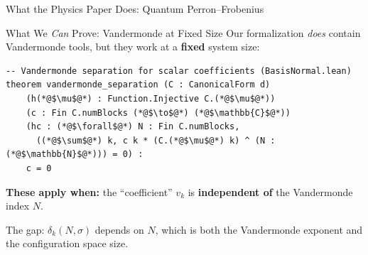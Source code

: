 \documentclass[aspectratio=169,10pt]{beamer}
\begin{document}
\begin{frame}{What the Physics Paper Does: Quantum Perron--Frobenius}
\vspace{0.3em}
\begin{center}
\end{center}
\end{frame}

\begin{frame}[fragile]{What We \emph{Can} Prove: Vandermonde at Fixed Size}
\vspace{-0.5em}
{\small Our formalization \emph{does} contain Vandermonde tools, but they work at a \textbf{fixed} system size:}

\vspace{0.1em}
\begin{lstlisting}[basicstyle=\ttfamily\fontsize{5}{6.5}\selectfont\color{white}]
-- Vandermonde separation for scalar coefficients (BasisNormal.lean)
theorem vandermonde_separation (C : CanonicalForm d)
    (h(*@$\mu$@*) : Function.Injective C.(*@$\mu$@*))
    (c : Fin C.numBlocks (*@$\to$@*) (*@$\mathbb{C}$@*))
    (hc : (*@$\forall$@*) N : Fin C.numBlocks,
      ((*@$\sum$@*) k, c k * (C.(*@$\mu$@*) k) ^ (N : (*@$\mathbb{N}$@*))) = 0) :
    c = 0
\end{lstlisting}

\vspace{0.05em}
{\small\textbf{These apply when:} the ``coefficient'' $v_k$ is \textbf{independent of} the Vandermonde index $N$.}

\vspace{0.15em}
{\small The gap: $\delta_k(N, \sigma)$ depends on $N$, which is both the Vandermonde exponent and the configuration space size.}

\vspace{0.1em}
{\small{}\quad{}}
\end{frame}
\end{document}
